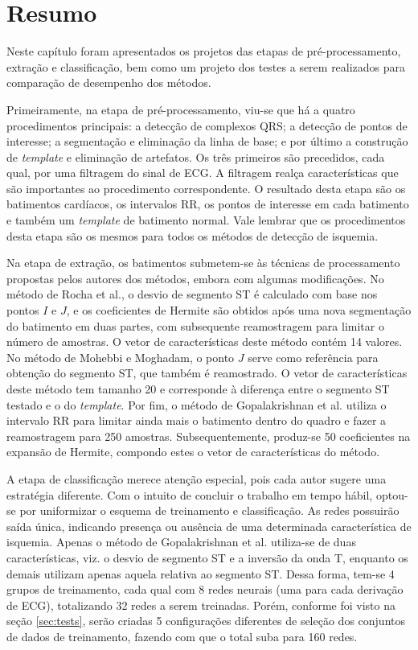 \section{Resumo}

Neste capítulo foram apresentados os projetos das etapas de pré-processamento, extração e classificação, bem como um projeto dos testes a serem realizados para comparação de desempenho dos métodos.

Primeiramente, na etapa de pré-processamento, viu-se que há a quatro procedimentos principais: a detecção de complexos QRS; a detecção de pontos de interesse; a segmentação e eliminação da linha de base; e por último a construção de \emph{template} e eliminação de artefatos. Os três primeiros são precedidos, cada qual, por uma filtragem do sinal de ECG. A filtragem realça características que são importantes ao procedimento correspondente. O resultado desta etapa são os batimentos cardíacos, os intervalos RR, os pontos de interesse em cada batimento e também um \emph{template} de batimento normal. Vale lembrar que os procedimentos desta etapa são os mesmos para todos os métodos de detecção de isquemia.

Na etapa de extração, os batimentos submetem-se às técnicas de processamento propostas pelos autores dos métodos, embora com algumas modificações. No método de Rocha et al., o desvio de segmento ST é calculado com base nos pontos $I$ e $J$, e os coeficientes de Hermite são obtidos após uma nova segmentação do batimento em duas partes, com subsequente reamostragem para limitar o número de amostras. O vetor de características deste método contém 14 valores. No método de Mohebbi e Moghadam, o ponto $J$ serve como referência para obtenção do segmento ST, que também é reamostrado. O vetor de características deste método tem tamanho 20 e corresponde à diferença entre o segmento ST testado e o do \emph{template}. Por fim, o método de Gopalakrishnan et al. utiliza o intervalo RR para limitar ainda mais o batimento dentro do quadro e fazer a reamostragem para 250 amostras. Subsequentemente, produz-se 50 coeficientes na expansão de Hermite, compondo estes o vetor de características do método.

A etapa de classificação merece atenção especial, pois cada autor sugere uma estratégia diferente. Com o intuito de concluir o trabalho em tempo hábil, optou-se por uniformizar o esquema de treinamento e classificação. As redes possuirão saída única, indicando presença ou ausência de uma determinada característica de isquemia. Apenas o método de Gopalakrishnan et al. utiliza-se de duas características, viz. o desvio de segmento ST e a inversão da onda T, enquanto os demais utilizam apenas aquela relativa ao segmento ST. Dessa forma, tem-se 4 grupos de treinamento, cada qual com 8 redes neurais (uma para cada derivação de ECG), totalizando 32 redes a serem treinadas. Porém, conforme foi visto na seção \ref{sec:tests}, serão criadas 5 configurações diferentes de seleção dos conjuntos de dados de treinamento, fazendo com que o total suba para 160 redes.

